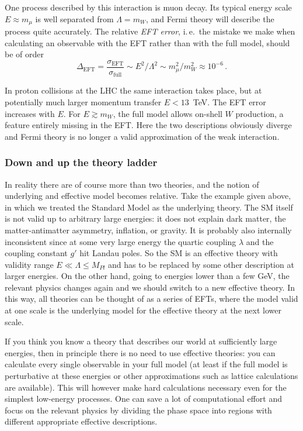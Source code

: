 One process described by this interaction is muon decay. Its typical
energy scale $E \approx m_\mu$ is well separated from $\Lambda = m_W$,
and Fermi theory will describe the process quite accurately. The
relative \emph{EFT error}, i.\,e.\ the mistake we make when
calculating an observable with the EFT rather than with the full
model, should be of order
%
\begin{equation}
  \Delta_\text{EFT} = \frac {\sigma_\text{EFT}} {\sigma_\text{full}}  \sim E^2 / \Lambda^2 \sim m_\mu^2 / m_W^2 \approx 10^{-6} \,.
\end{equation}

In proton collisions at the LHC the same interaction takes place, but
at potentially much larger momentum transfer $E < 13$~TeV. The EFT
error increases with $E$. For $E \gtrsim m_W$, the full model allows
on-shell $W$ production, a feature entirely missing in the EFT. Here
the two descriptions obviously diverge and Fermi theory is no longer a
valid approximation of the weak interaction.



\subsubsection*{Down and up the theory ladder}

In reality there are of course more than two theories, and the notion
of underlying and effective model becomes relative. Take the example
given above, in which we treated the Standard Model as the underlying
theory. The SM itself is not valid up to arbitrary large energies: it
does not explain dark matter, the matter-antimatter asymmetry,
inflation, or gravity. It is probably also internally inconsistent
since at some very large energy the quartic coupling $\lambda$ and the
coupling constant $g'$ hit Landau poles. So the SM is an effective
theory with validity range $E \ll \Lambda \le M_{Pl}$ and has to be
replaced by some other description at larger energies. On the other
hand, going to energies lower than a few GeV, the relevant physics
changes again and we should switch to a new effective theory. In this
way, all theories can be thought of as a series of EFTs, where the
model valid at one scale is the underlying model for the effective
theory at the next lower scale.

If you think you know a theory that describes our world at
sufficiently large energies, then in principle there is no need to use
effective theories: you can calculate every single observable in your
full model (at least if the full model is perturbative at these
energies or other approximations such as lattice calculations are
available). This will however make hard calculations necessary even
for the simplest low-energy processes. One can save a lot of
computational effort and focus on the relevant physics by dividing the
phase space into regions with different appropriate effective
descriptions.

